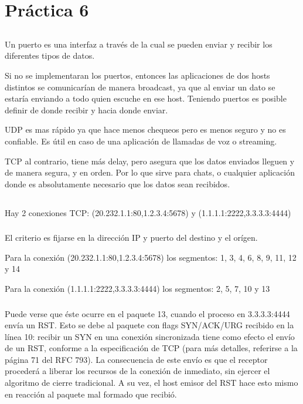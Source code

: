 \section{Práctica 6}

\subsection{}
Un puerto es una interfaz a través de la cual se pueden enviar y recibir los
diferentes tipos de datos.

Si no se implementaran los puertos, entonces las aplicaciones de dos hosts
distintos se comunicarían de manera broadcast, ya que al enviar un dato se
estaría enviando a todo quien escuche en ese host. Teniendo puertos es posible
definir de donde recibir y hacia donde enviar.

UDP es mas rápido ya que hace menos chequeos pero es menos seguro y no es
confiable. Es útil en caso de una aplicación de llamadas de voz o streaming.

TCP al contrario, tiene más delay, pero asegura que los datos enviados lleguen y
de manera segura, y en orden. Por lo que sirve para chats, o cualquier
aplicación donde es absolutamente necesario que los datos sean recibidos.

\setcounter{subsection}{4}
\subsection{}
\subsubsection{}
Hay 2 conexiones TCP: (20.232.1.1:80,1.2.3.4:5678) y (1.1.1.1:2222,3.3.3.3:4444)

\subsubsection{}
El criterio es fijarse en la dirección IP y puerto del destino y el orígen.

Para la conexión (20.232.1.1:80,1.2.3.4:5678) los segmentos: 1, 3, 4, 6, 8, 9,
11, 12 y 14

Para la conexión (1.1.1.1:2222,3.3.3.3:4444) los segmentos: 2, 5, 7, 10 y 13

\subsubsection{}
Puede verse que éste ocurre en el paquete 13, cuando el proceso en 3.3.3.3:4444
envía un RST. Esto se debe al paquete con flags SYN/ACK/URG recibido en la línea
10: recibir un SYN en una conexión sincronizada tiene como efecto el envío de un
RST, conforme a la especificación de TCP (para más detalles, referirse a la
página 71 del RFC 793). La consecuencia de este envío es que el receptor
procederá a liberar los recursos de la conexión de inmediato, sin ejercer el
algoritmo de cierre tradicional. A su vez, el host emisor del RST hace esto
mismo en reacción al paquete mal formado que recibió.

